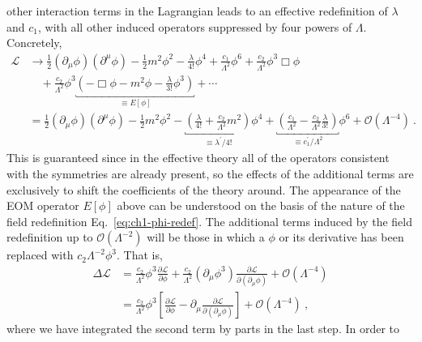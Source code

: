 other interaction terms in the Lagrangian leads to an effective redefinition of
$\lambda$ and $c_{1}$, with all other induced operators suppressed by four
powers of $\Lambda$. Concretely,
\begin{equation}
  \begin{aligned}
    \mathscr{L} &\to \frac{1}{2} (\partial_{\mu} \phi) (\partial^{\mu} \phi) - \frac{1}{2} m^{2} \phi^{2} - \frac{\lambda}{4!} \phi^{4} + \frac{c_{1}}{\Lambda^{2}} \phi^{6} + \frac{c_{2}}{\Lambda^{2}} \phi^{3} \Box \phi \\
    &\quad + \frac{c_{2}}{\Lambda^{2}} \phi^{3} \underbracket{\left( - \Box \phi - m^{2} \phi - \frac{\lambda}{3!}\phi^{3} \right)}_{\equiv E[\phi]} + \cdots \\
    &= \frac{1}{2} (\partial_{\mu} \phi) (\partial^{\mu} \phi) - \frac{1}{2} m^{2} \phi^{2} - \underbracket{\left( \frac{\lambda}{4!} + \frac{c_{2}}{\Lambda^{2}}m^{2} \right)}_{\equiv \lambda^{\prime} / 4!} \phi^{4} + \underbracket{\left( \frac{c_{1}}{\Lambda^{2}} - \frac{c_{2}}{\Lambda^{2}} \frac{\lambda}{3!} \right)}_{\equiv c^{\prime}_{1} / \Lambda^{2}}\phi^{6} + \mathcal{O}(\Lambda^{-4}) \ .
  \end{aligned}
\end{equation}
This is guaranteed since in the effective theory all of the operators consistent
with the symmetries are already present, so the effects of the additional terms
are exclusively to shift the coefficients of the theory around. The appearance
of the EOM operator $E[\phi]$ above can be understood on the basis of the nature
of the field redefinition Eq.~\eqref{eq:ch1-phi-redef}. The additional terms induced
by the field redefinition up to $\mathcal{O}(\Lambda^{-2})$ will be those in
which a $\phi$ or its derivative has been replaced with
$c_{2} \Lambda^{-2} \phi^{3}$. That is,
\begin{equation}
  \begin{aligned}
    \Delta \mathscr{L} &= \frac{c_{2}}{\Lambda^{2}} \phi^{3} \frac{\partial \mathscr{L}}{\partial \phi} + \frac{c_{2}}{\Lambda^{2}} (\partial_{\mu} \phi^{3}) \frac{\partial \mathscr{L}}{\partial (\partial_{\mu} \phi)} + \mathcal{O}(\Lambda^{-4}) \\
    &= \frac{c_{2}}{\Lambda^{2}} \phi^{3} \left[ \frac{\partial \mathscr{L}}{\partial \phi} - \partial_{\mu} \frac{\partial \mathscr{L}}{\partial (\partial_{\mu} \phi)} \right]  + \mathcal{O}(\Lambda^{-4}) \ ,
  \end{aligned}
\end{equation}
where we have integrated the second term by parts in the last step. In order to
